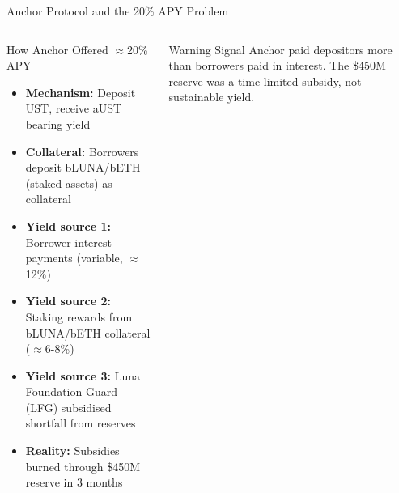 \documentclass[8pt,aspectratio=169]{beamer}
\begin{document}
\begin{frame}{Anchor Protocol and the 20\% APY Problem}
\begin{columns}[T]
\begin{block}{How Anchor Offered $\approx$20\% APY}
\begin{itemize}\setlength{\itemsep}{2pt}
  \item \textbf{Mechanism:} Deposit UST, receive aUST bearing yield
  \item \textbf{Collateral:} Borrowers deposit bLUNA/bETH (staked assets) as collateral
  \item \textbf{Yield source 1:} Borrower interest payments (variable, $\approx$12\%)
  \item \textbf{Yield source 2:} Staking rewards from bLUNA/bETH collateral ($\approx$6-8\%)
  \item \textbf{Yield source 3:} Luna Foundation Guard (LFG) subsidised shortfall from reserves
  \item \textbf{Reality:} Subsidies burned through \$450M reserve in 3 months
\end{itemize}
\end{block}
\vspace{2mm}
\begin{alertblock}{Warning Signal}
\scriptsize Anchor paid depositors more than borrowers paid in interest. The \$450M reserve was a time-limited subsidy, not sustainable yield.
\end{alertblock}
\end{columns}
\end{frame}
\end{document}
